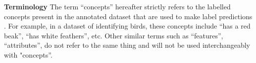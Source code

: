 \documentclass[../main.tex]{subfiles}
\begin{document}
\textbf{Terminology}
The term ``concepts'' hereafter strictly refers to the labelled concepts present
in the annotated dataset
that are used to make label predictions
. For example, in a dataset of identifying birds,
these concepts include ``has a red beak'', ``has white feathers'', etc.
Other similar terms such as ``features'', ``attributes'', do not refer to the same thing
and will not be used interchangeably with
"concepts''.




\end{document}
